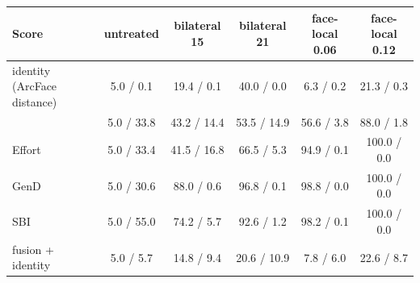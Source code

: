 \begin{tabular}{@{}l ccccc@{}}
\toprule
Score & untreated & bilateral 15 & bilateral 21 & face-local 0.06 & face-local 0.12 \\
\midrule
identity (ArcFace distance) & 5.0 / 0.1 & 19.4 / 0.1 & 40.0 / 0.0 & 6.3 / 0.2 & 21.3 / 0.3 \\
\oursB{} & 5.0 / 33.8 & 43.2 / 14.4 & 53.5 / 14.9 & 56.6 / 3.8 & 88.0 / 1.8 \\
Effort & 5.0 / 33.4 & 41.5 / 16.8 & 66.5 / 5.3 & 94.9 / 0.1 & 100.0 / 0.0 \\
GenD & 5.0 / 30.6 & 88.0 / 0.6 & 96.8 / 0.1 & 98.8 / 0.0 & 100.0 / 0.0 \\
SBI & 5.0 / 55.0 & 74.2 / 5.7 & 92.6 / 1.2 & 98.2 / 0.1 & 100.0 / 0.0 \\
fusion \oursB{} + identity & 5.0 / 5.7 & 14.8 / 9.4 & 20.6 / 10.9 & 7.8 / 6.0 & 22.6 / 8.7 \\
\bottomrule
\end{tabular}
